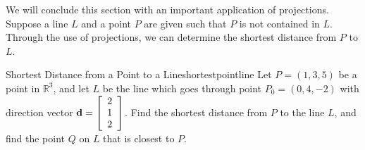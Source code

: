 We will conclude this section with an important application of projections. Suppose a line $L$ and a point $P$ are given such that $P$ is not contained in $L$. Through the use of projections, we can determine the shortest distance from $P$ to $L$. 

\begin{example}{Shortest Distance from a Point to a Line}{shortestpointline}
Let $P = (1,3,5)$ be a point in $\mathbb{R}^3$, and let $L$ be the line which goes through point $P_0 = (0,4,-2)$ with direction vector ${\bf d} = \left[
\begin{array}{r}
2 \\
1 \\
2
\end{array}
\right]
$.  Find the shortest distance from $P$ to the line $L$, and find the point $Q$ on $L$ that is closest to $P$. 
\end{example}

